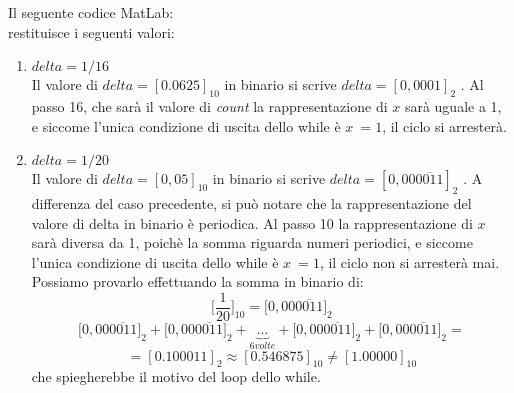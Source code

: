 Il seguente codice MatLab:\\

restituisce i seguenti valori:\\
\begin{enumerate}
	\item $delta = 1/16$\\
		Il valore di $delta=[0.0625]_{10}$ in binario si scrive $delta=[0,0001]_2$ . Al passo 16, che sarà il valore di \textit{count} la rappresentazione di $x$ sarà uguale a 1, e siccome l'unica condizione di uscita dello while è $x~=1$, il ciclo si arresterà.\\
	\item $delta = 1/20$\\
		Il valore di $delta=[0,05]_{10}$ in binario si scrive $delta=[0,00\overline{0011}]_2$ . A differenza del caso precedente, si può notare che la rappresentazione del valore di delta in binario è periodica. Al passo 10 la rappresentazione di $x$ sarà diversa da 1, poichè la somma riguarda numeri periodici, e siccome l'unica condizione di uscita dello while è $x~=1$, il ciclo non si arresterà mai.\\
Possiamo provarlo effettuando la somma in binario di:
	\[
	\Big[\frac{1}{20}\Big]_{10}=\Big[0,00\overline{0011}\Big]_2
	\]
	\[
	\Big[0,00\overline{0011}\Big]_2+\Big[0,00\overline{0011}\Big]_2+ \underbrace{...}_{6 volte}+\Big[0,00\overline{0011}\Big]_2+\Big[0,00\overline{0011}\Big]_2 = 
	\]
	\[
	= [0.100011]_2 \approx [0.546875]_{10} \neq [1.00000]_{10}
	\]
che spiegherebbe il motivo del loop dello while.
\end{enumerate}